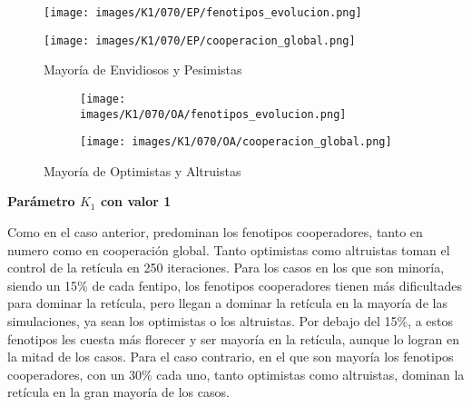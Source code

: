 \documentclass[a4paper,12pt]{report}
\begin{document}
\begin{figure}[h]
    \centering
    \begin{minipage}{0.49\textwidth}
    \centering
    \texttt{[image: images/K1/070/EP/fenotipos\_evolucion.png]}
    \label{fig:enter-label}
    \end{minipage}
    \hfill
    \begin{minipage}{0.49\textwidth}
    \centering
    \texttt{[image: images/K1/070/EP/cooperacion\_global.png]}
    \label{fig:enter-label}
    \end{minipage}
    \caption{Mayoría de Envidiosos y Pesimistas}
\end{figure}
\begin{figure}[h]
    \centering
    \begin{subfigure}[t]{0.49\textwidth}
        \centering
        \texttt{[image: images/K1/070/OA/fenotipos\_evolucion.png]}
        \label{fig:enter-label}
    \end{subfigure}
    \hfill
    \begin{subfigure}[t]{0.49\textwidth}
        \centering
        \texttt{[image: images/K1/070/OA/cooperacion\_global.png]}
        \label{fig:enter-label}
    \end{subfigure}
    \caption{Mayoría de Optimistas y Altruistas}
\end{figure}

\newpage

\vspace{1.5em}
\noindent\textbf{Parámetro \( K_1 \) con valor 1}
\vspace{0.5em}

Como en el caso anterior, predominan los fenotipos cooperadores, tanto en numero como en cooperación global. Tanto optimistas como altruistas toman el control de la retícula en 250 iteraciones. Para los casos en los que son minoría, siendo un 15\% de cada fentipo, los fenotipos cooperadores tienen más dificultades para dominar la retícula, pero llegan a dominar la retícula en la mayoría de las simulaciones, ya sean los optimistas o los altruistas.
Por debajo del 15\%, a estos fenotipos les cuesta más florecer y ser mayoría en la retícula, aunque lo logran en la mitad de los casos.
Para el caso contrario, en el que son mayoría los fenotipos cooperadores, con un 30\% cada uno, tanto optimistas como altruistas, dominan la retícula en la gran mayoría de los casos.
\end{document}
